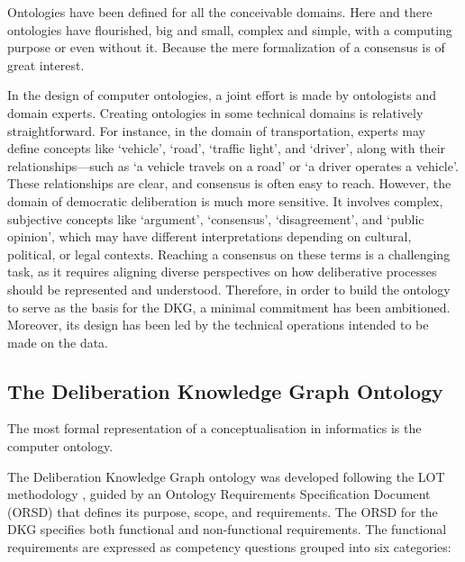 \documentclass[runningheads]{llncs}  %
\begin{document}
Ontologies have been defined for all the conceivable domains. Here and there ontologies have flourished, big and small, complex and simple, with a computing purpose or even without it. Because the mere formalization of a consensus is of great interest. 

In the design of computer ontologies, a joint effort is made by ontologists and domain experts. Creating ontologies in some technical domains is relatively straightforward. For instance, in the domain of transportation, experts may define concepts like `vehicle', `road', `traffic light', and `driver', along with their relationships—such as `a vehicle travels on a road' or `a driver operates a vehicle'. These relationships are clear, and consensus is often easy to reach. However, the domain of democratic deliberation is much more sensitive. It involves complex, subjective concepts like `argument', `consensus', `disagreement', and `public opinion', which may have different interpretations depending on cultural, political, or legal contexts. Reaching a consensus on these terms is a challenging task, as it requires aligning diverse perspectives on how deliberative processes should be represented and understood. Therefore, in order to build the ontology to serve as the basis for the DKG, a minimal commitment has been ambitioned. Moreover, its design has been led by the technical operations intended to be made on the data.

\subsection{The Deliberation Knowledge Graph Ontology}
The most formal representation of a conceptualisation in informatics is the computer ontology. 

The Deliberation Knowledge Graph ontology was developed following the LOT methodology \cite{poveda-villalon2022lot}, guided by an Ontology Requirements Specification Document (ORSD) that defines its purpose, scope, and requirements.
The ORSD for the DKG specifies both functional and non-functional requirements. The functional requirements are expressed as competency questions grouped into six categories:
\end{document}
